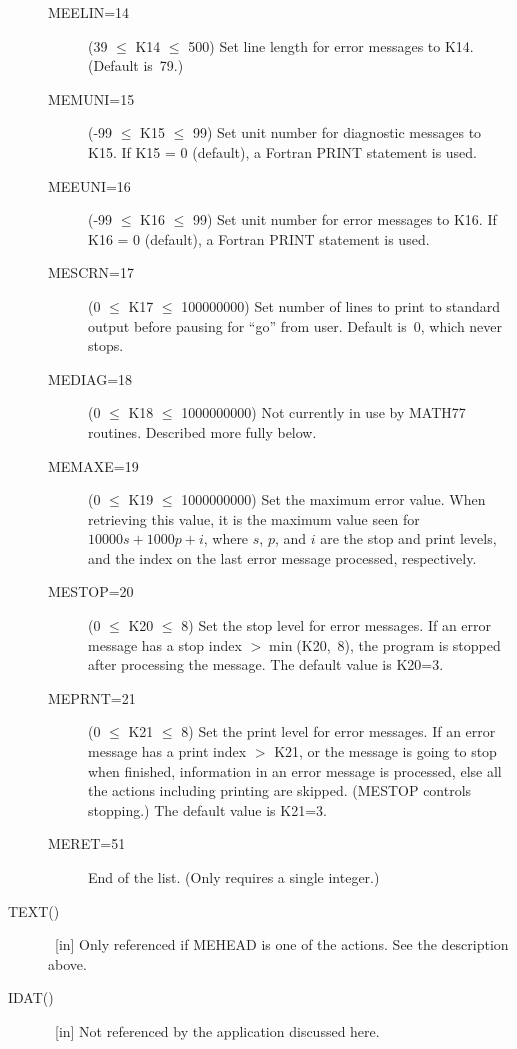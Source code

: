 \documentclass[twoside]{MATH77}
\begin{document}
\begin{description}
\begin{description}
\item[MEELIN=14]  (39  $\leq $ K14 $\leq $ 500) Set line length for
error messages to K14. (Default is~79.)

\item[MEMUNI=15]  (-99 $\leq $ K15 $\leq $ 99) Set unit number for
diagnostic messages to K15. If K15 = 0 (default), a Fortran PRINT
statement is used.

\item[MEEUNI=16]  (-99 $\leq $ K16 $\leq $ 99) Set unit number for error
messages to K16. If K16 = 0 (default), a Fortran PRINT statement is
used.

\item[MESCRN=17]  (0 $\leq $ K17 $\leq $ 100000000) Set number of lines
to print to standard output before pausing for ``go'' from user.
Default is~0, which never stops.

\item[MEDIAG=18]  (0 $\leq $ K18 $\leq $ 1000000000) Not currently in
use by MATH77 routines.  Described more fully below.

\item[MEMAXE=19]  (0 $\leq $ K19 $\leq $ 1000000000) Set the maximum
error value. When retrieving this value, it is the maximum value seen
for $10000 s+1000 p+i$, where $s$, $p$, and $i$ are the stop and
print levels, and the index on the last error message processed,
respectively.

\item[MESTOP=20]  (0 $\leq $ K20 $\leq $ 8) Set the stop level for error
messages. If an error message has a stop index $>\min $(K20,~8), the
program is stopped after processing the message. The default value is
K20=3.

\item[MEPRNT=21]  (0 $\leq $ K21 $\leq $ 8) Set the print level for
error messages. If an error message has a print index $>$ K21, or the
message is going to stop when finished, information in an error
message is processed, else all the actions including printing are
skipped. (MESTOP controls stopping.) The default value is K21=3.

\item[MERET=51]  End of the list. (Only requires a single integer.)
\end{description}

\item[TEXT()]  \ [in] Only referenced if MEHEAD is one of the actions. See the
description above.

\item[IDAT()]  \ [in] Not referenced by the application discussed here.
\end{description}
\end{document}
